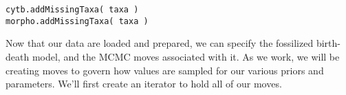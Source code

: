 {\tt \begin{snugshade*}
\begin{lstlisting}
cytb.addMissingTaxa( taxa )
morpho.addMissingTaxa( taxa )
\end{lstlisting}
\end{snugshade*}}

%
%
%
%
%
%
%

Now that our data are loaded and prepared, we can specify the fossilized birth-death model, and the MCMC moves associated with it. As we work, we will be creating moves to govern how values are sampled for our various priors and parameters. We'll first create an iterator to hold all of our moves.

